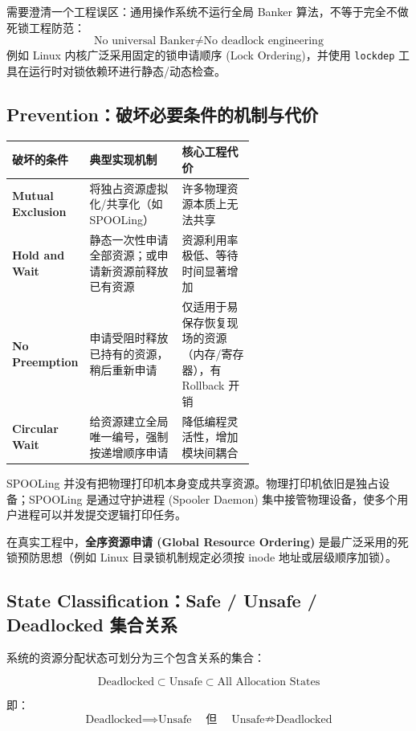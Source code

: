 \documentclass[11pt,a4paper]{ctexart}
\newcommand{\kw}[1]{\textbf{#1}}
\newcommand{\code}[1]{\texttt{#1}}
\begin{document}
需要澄清一个工程误区：通用操作系统不运行全局 Banker 算法，不等于完全不做死锁工程防范：
\[
\boxed{\text{No universal Banker} \neq \text{No deadlock engineering}}
\]
例如 Linux 内核广泛采用固定的锁申请顺序 (Lock Ordering)，并使用 \code{lockdep} 工具在运行时对锁依赖环进行静态/动态检查。

\subsection{Prevention：破坏必要条件的机制与代价}

\begingroup
\small
\renewcommand{\arraystretch}{1.25}
\setlength{\tabcolsep}{6pt}
\begin{tabularx}{\linewidth}{>{\bfseries}p{0.22\linewidth} p{0.38\linewidth} X}
\toprule
破坏的条件 & 典型实现机制 & 核心工程代价\\
\midrule
Mutual Exclusion & 将独占资源虚拟化/共享化（如 SPOOLing） & 许多物理资源本质上无法共享\\
Hold and Wait & 静态一次性申请全部资源；或申请新资源前释放已有资源 & 资源利用率极低、等待时间显著增加\\
No Preemption & 申请受阻时释放已持有的资源，稍后重新申请 & 仅适用于易保存恢复现场的资源（内存/寄存器），有 Rollback 开销\\
Circular Wait & 给资源建立全局唯一编号，强制按递增顺序申请 & 降低编程灵活性，增加模块间耦合\\
\bottomrule
\end{tabularx}
\endgroup

\begin{method}
SPOOLing 并没有把物理打印机本身变成共享资源。物理打印机依旧是独占设备；SPOOLing 是通过守护进程 (Spooler Daemon) 集中接管物理设备，使多个用户进程可以并发提交逻辑打印任务。
\end{method}

在真实工程中，\kw{全序资源申请 (Global Resource Ordering)} 是最广泛采用的死锁预防思想（例如 Linux 目录锁机制规定必须按 inode 地址或层级顺序加锁）。

\subsection{State Classification：Safe / Unsafe / Deadlocked 集合关系}

系统的资源分配状态可划分为三个包含关系的集合：

\[
\boxed{\text{Deadlocked} \subset \text{Unsafe} \subset \text{All Allocation States}}
\]

即：
\[
\boxed{\text{Deadlocked} \implies \text{Unsafe}} \quad \text{但} \quad \boxed{\text{Unsafe} \nRightarrow \text{Deadlocked}}
\]
\end{document}
